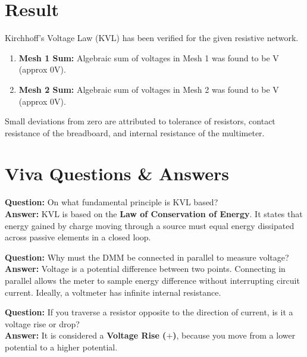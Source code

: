\section{Result}
Kirchhoff's Voltage Law (KVL) has been verified for the given resistive network.
\begin{enumerate}
    \item \textbf{Mesh 1 Sum:} Algebraic sum of voltages in Mesh 1 was found to be \underline{\hspace{1cm}} V (approx $0\text{V}$).
    \item \textbf{Mesh 2 Sum:} Algebraic sum of voltages in Mesh 2 was found to be \underline{\hspace{1cm}} V (approx $0\text{V}$).
\end{enumerate}

Small deviations from zero are attributed to tolerance of resistors, contact resistance of the breadboard, and internal resistance of the multimeter.

\section{Viva Questions \& Answers}

\begin{vivaqa}
\textbf{Question:} On what fundamental principle is KVL based?\\[4pt]
\textbf{Answer:} KVL is based on the \textbf{Law of Conservation of Energy}. It states that energy gained by charge moving through a source must equal energy dissipated across passive elements in a closed loop.
\end{vivaqa}

\begin{vivaqa}
\textbf{Question:} Why must the DMM be connected in parallel to measure voltage?\\[4pt]
\textbf{Answer:} Voltage is a potential difference between two points. Connecting in parallel allows the meter to sample energy difference without interrupting circuit current. Ideally, a voltmeter has infinite internal resistance.
\end{vivaqa}

\begin{vivaqa}
\textbf{Question:} If you traverse a resistor opposite to the direction of current, is it a voltage rise or drop?\\[4pt]
\textbf{Answer:} It is considered a \textbf{Voltage Rise ($+$)}, because you move from a lower potential to a higher potential.
\end{vivaqa}

